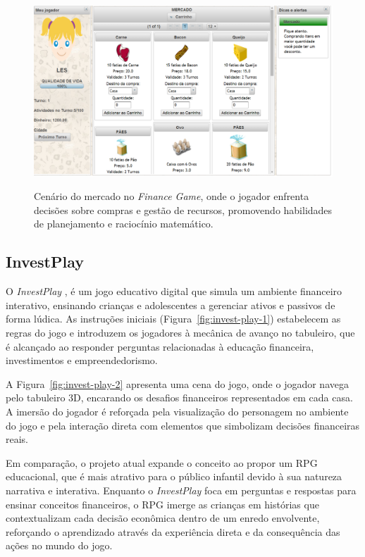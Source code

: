\begin{figure}[ht]
	\centering
	\caption{Cenário do mercado no \textit{Finance Game}, onde o jogador enfrenta decisões sobre compras e gestão de recursos, promovendo habilidades de planejamento e raciocínio matemático.}
	\includegraphics[scale=0.3]{Textuais/Pictures/Finance-game-2.png}
	\label{fig:finance-game-2}
\end{figure}

\newpage

\subsection{InvestPlay}
\label{subsec:investplay}

O \textit{InvestPlay} \cite{santos2020investplay}, é um jogo educativo digital que simula um ambiente financeiro interativo, ensinando crianças e adolescentes a gerenciar ativos e passivos de forma lúdica. As instruções iniciais (Figura~\ref{fig:invest-play-1}) estabelecem as regras do jogo e introduzem os jogadores à mecânica de avanço no tabuleiro, que é alcançado ao responder perguntas relacionadas à educação financeira, investimentos e empreendedorismo.

A Figura~\ref{fig:invest-play-2} apresenta uma cena do jogo, onde o jogador navega pelo tabuleiro 3D, encarando os desafios financeiros representados em cada casa. A imersão do jogador é reforçada pela visualização do personagem no ambiente do jogo e pela interação direta com elementos que simbolizam decisões financeiras reais.

Em comparação, o projeto atual expande o conceito ao propor um RPG educacional, que é mais atrativo para o público infantil devido à sua natureza narrativa e interativa. Enquanto o \textit{InvestPlay} foca em perguntas e respostas para ensinar conceitos financeiros, o RPG imerge as crianças em histórias que contextualizam cada decisão econômica dentro de um enredo envolvente, reforçando o aprendizado através da experiência direta e da consequência das ações no mundo do jogo.

